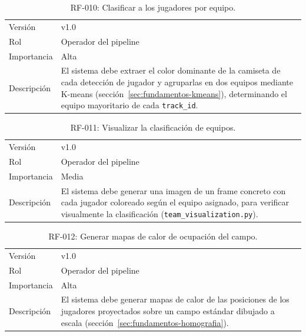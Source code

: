 \begin{table}[htp]
\centering
\caption{RF-010: Clasificar a los jugadores por equipo.}
\label{tab:rf-010}
\renewcommand{\arraystretch}{1.2}
\begin{tabular}{|p{3.1cm}|p{9.2cm}|}
\hline
\rowcolor{gray!25}
\multicolumn{2}{|l|}{\textbf{RF-010 -- Clasificar a los jugadores por equipo}} \\
\hline
Versión & v1.0 \\
\hline
Rol & Operador del pipeline \\
\hline
Importancia & Alta \\
\hline
Descripción & El sistema debe extraer el color dominante de la camiseta de
  cada detección de jugador y agruparlas en dos equipos mediante K-means
  (sección~\ref{sec:fundamentos-kmeans}), determinando el equipo mayoritario
  de cada \texttt{track\_id}. \\
\hline
\end{tabular}
\end{table}

\begin{table}[htp]
\centering
\caption{RF-011: Visualizar la clasificación de equipos.}
\label{tab:rf-011}
\renewcommand{\arraystretch}{1.2}
\begin{tabular}{|p{3.1cm}|p{9.2cm}|}
\hline
\rowcolor{gray!25}
\multicolumn{2}{|l|}{\textbf{RF-011 -- Visualizar la clasificación de equipos}} \\
\hline
Versión & v1.0 \\
\hline
Rol & Operador del pipeline \\
\hline
Importancia & Media \\
\hline
Descripción & El sistema debe generar una imagen de un frame concreto con
  cada jugador coloreado según el equipo asignado, para verificar
  visualmente la clasificación (\texttt{team\_visualization.py}). \\
\hline
\end{tabular}
\end{table}

\begin{table}[htp]
\centering
\caption{RF-012: Generar mapas de calor de ocupación del campo.}
\label{tab:rf-012}
\renewcommand{\arraystretch}{1.2}
\begin{tabular}{|p{3.1cm}|p{9.2cm}|}
\hline
\rowcolor{gray!25}
\multicolumn{2}{|l|}{\textbf{RF-012 -- Generar mapas de calor de ocupación del campo}} \\
\hline
Versión & v1.0 \\
\hline
Rol & Operador del pipeline \\
\hline
Importancia & Alta \\
\hline
Descripción & El sistema debe generar mapas de calor de las posiciones de
  los jugadores proyectados
  sobre un campo estándar dibujado a escala
  (sección~\ref{sec:fundamentos-homografia}). \\
\hline
\end{tabular}
\end{table}

